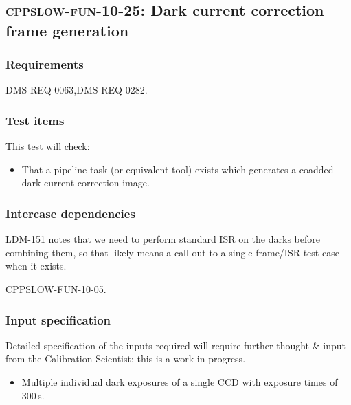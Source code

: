 \subsection{\textsc{cppslow-fun-10-25}: Dark current correction frame generation}
\label{cppslow-fun-10-25}

\subsubsection{Requirements}

DMS-REQ-0063,DMS-REQ-0282.

\subsubsection{Test items}

This test will check:

\begin{itemize}

  \item{That a pipeline task (or equivalent tool) exists which generates a
  coadded dark current correction image.}

\end{itemize}

\subsubsection{Intercase dependencies}

\begin{note}
LDM-151 notes that we need to perform standard ISR on the darks
before combining them, so that likely means a call out to a single frame/ISR
test case when it exists.
\end{note}

\hyperref[cppslow-fun-10-05]{CPPSLOW-FUN-10-05}.

\subsubsection{Input specification}

\begin{note}
Detailed specification of the inputs required will require further thought \&
input from the Calibration Scientist; this is a work in progress.
\end{note}

\begin{itemize}

  \item{Multiple individual dark exposures of a single CCD with exposure times
  of 300\,s.}

\end{itemize}

